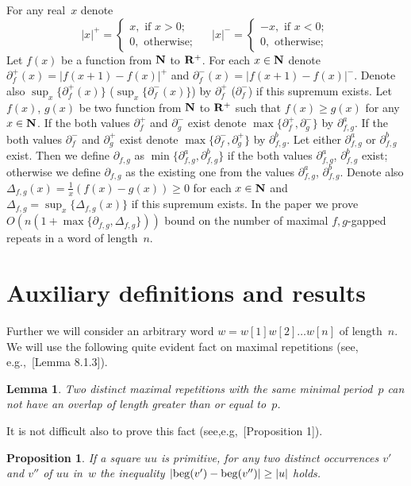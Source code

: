 \documentclass{article}
\newtheorem{proposition}{Proposition}
\newtheorem{lemma}{Lemma}
\begin{document}
For any real~$x$ denote
$$
|x|^+=\begin{cases}
x, \text{ if } x>0;\\
0, \text{ otherwise; }
\end{cases}\quad
|x|^-=\begin{cases}
-x, \text{ if } x<0;\\
0, \text{ otherwise; }
\end{cases}
$$
Let $f(x)$ be a function from ${\bf N}$ to ${\bf R^+}$. For each $x\in {\bf N}$
denote $\partial^+_f(x)=|f(x+1)-f(x)|^+$ and $\partial^-_f(x)=|f(x+1)-f(x)|^-$.
Denote also $\sup_{x}\{\partial^+_f(x)\}$ ($\sup_{x}\{\partial^-_f(x)\}$) by
$\partial^+_f$ ($\partial^-_f$) if this supremum exists. Let $f(x)$, $g(x)$
be two function from ${\bf N}$ to ${\bf R^+}$ such that $f(x)\ge g(x)$ for
any $x\in {\bf N}$. If the both values $\partial^+_f$ and $\partial^-_g$
exist denote $\max\{\partial^+_f, \partial^-_g\}$ by $\partial^a_{f, g}$.
If the both values $\partial^-_f$ and $\partial^+_g$ exist denote 
$\max\{\partial^-_f, \partial^+_g\}$ by $\partial^b_{f, g}$. Let either
$\partial^a_{f, g}$ or $\partial^b_{f, g}$ exist. Then we define 
$\partial_{f, g}$ as $\min \{\partial^a_{f, g}, \partial^b_{f, g}\}$ 
if the both values $\partial^a_{f, g}$, $\partial^b_{f, g}$ exist;
otherwise we define $\partial_{f, g}$ as the existing one from the
values $\partial^a_{f, g}$, $\partial^b_{f, g}$. Denote also $\Delta_{f, g}(x)=
\frac{1}{x}(f(x)-g(x))\ge 0$ for each $x\in {\bf N}$ and $\Delta_{f, g}=
\sup_x\{\Delta_{f, g}(x)\}$ if this supremum exists. In the paper we
prove $O(n(1+\max\{\partial_{f, g}, \Delta_{f, g}\}))$ bound on the 
number of maximal $f,g$-gapped repeats in a word of length~$n$.



\section{Auxiliary definitions and results}

Further we will consider an arbitrary word $w=w[1]w[2]\ldots w[n]$ of length~$n$.
We will use the following quite evident fact on maximal repetitions (see, e.g.,~\cite{Lothaire05}[Lemma 8.1.3]).
\begin{lemma}
Two distinct maximal repetitions with the same minimal period~$p$ can not
have an overlap of length greater than or equal to~$p$.
\label{overlap}
\end{lemma}

It is not difficult also to prove this fact (see,e.g,~\cite{forJDA}[Proposition 1]).
\begin{proposition}
If a square $uu$ is primitive, for any two distinct occurrences $v'$
and $v''$ of $uu$ in~$w$ the inequality $|{\rm beg} (v')-{\rm beg} (v'')|\ge |u|$
holds.
\label{onprimsqr}
\end{proposition}
\end{document}
